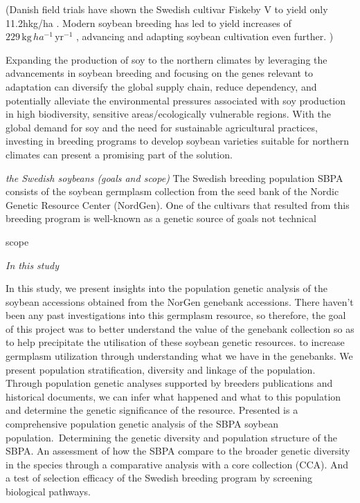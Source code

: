 \documentclass[9pt, twocolumn,twoside]{gsajnl}
\begin{document}
(Danish field trials have shown the Swedish cultivar Fiskeby V to yield only 11.2hkg/ha \cite{petersen09,petersen10}. Modern soybean breeding has led to yield increases of $229 \, \text{kg} \, ha^{-1} \, \text{yr}^{-1}$ \cite{rincker14}, advancing and adapting soybean cultivation even further. )

Expanding the production of soy to the northern climates by leveraging the advancements in soybean breeding and focusing on the genes relevant to adaptation can diversify the global supply chain, reduce dependency, and potentially alleviate the environmental pressures associated with soy production in high biodiversity, sensitive areas/ecologically vulnerable regions. With the global demand for soy and the need for sustainable agricultural practices, investing in breeding programs to develop soybean varieties suitable for northern climates can present a promising part of the solution. 

\textit{the Swedish soybeans (goals and scope)}
The Swedish breeding population SBPA consists of the soybean germplasm collection from the seed bank of the Nordic Genetic Resource Center (NordGen). One of the cultivars that resulted from this breeding program is well-known as a genetic source of 
goals
not technical

scope

\textit{In this study}

In this study, we present insights into the population genetic analysis of the soybean accessions obtained from the NorGen genebank accessions. 
There haven't been any past investigations into this germplasm resource, so therefore, the goal of this project was to better understand the value of the genebank collection so as to help precipitate the utilisation of these soybean genetic resources. to increase germplasm utilization through understanding what we have in the genebanks. We present population stratification, diversity and linkage of the population. Through population genetic analyses supported by breeders publications and historical documents, we can infer what happened and what  to this population and determine the genetic significance of the resource. 
Presented is a comprehensive population genetic analysis of the SBPA soybean population. Determining the genetic diversity and population structure of the SBPA. An assessment of how the SBPA compare to the broader genetic diversity in the species through a comparative analysis with a core collection (CCA). 
And a test of selection efficacy of the Swedish breeding program by screening biological pathways. 
\end{document}
